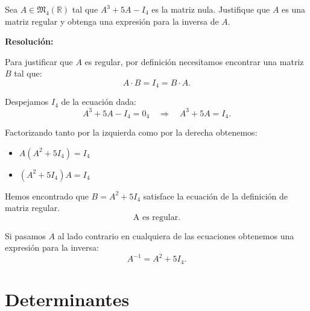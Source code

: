 \documentclass[a4paper,12pt]{article}
\begin{document}
\begin{ejercicio}[title=Ejercicio 23]
Sea $A \in \mathfrak{M}_4(\mathbb{R})$ tal que $A^3 + 5A - I_4$ es la matriz nula.  
Justifique que $A$ es una matriz regular y obtenga una expresión para la inversa de $A$.

\tcblower
\textbf{Resolución:}

Para justificar que $A$ es regular, por definición necesitamos encontrar una matriz $B$ tal que:
\[
A \cdot B = I_4 = B \cdot A.
\]

Despejamos $I_4$ de la ecuación dada:
\[
A^3 + 5A - I_4 = 0_4 \quad \Rightarrow \quad A^3 + 5A = I_4.
\]

Factorizando tanto por la izquierda como por la derecha obtenemos:
\begin{itemize}
\item $A(A^2 + 5 I_4) = I_4$
\item $(A^2 + 5 I_4)A = I_4$
\end{itemize}

Hemos encontrado que $B = A^2 + 5 I_4$ satisface la ecuación de la definición de matriz regular.  
\[
\boxed{\text{A es regular}}.
\]

\vspace{1em}

Si pasamos $A$ al lado contrario en cualquiera de las ecuaciones obtenemos una expresión para la inversa:
\[
\boxed{A^{-1} = A^2 + 5 I_4}.
\]

\end{ejercicio}

\section{Determinantes}
\end{document}
